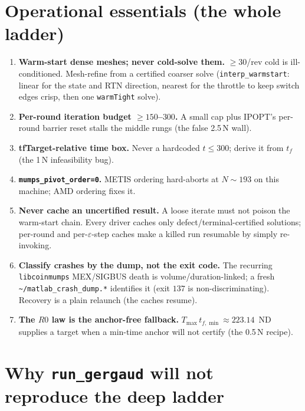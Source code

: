 \documentclass[11pt]{article}
\newcommand{\code}[1]{\texttt{\small #1}}
\newcommand{\file}[1]{\texttt{\small #1}}
\newcommand{\Tmax}{T_{\max}}
\begin{document}
\section{Operational essentials (the whole ladder)}
\label{sec:ops}
\begin{enumerate}[leftmargin=1.4em]
\item \textbf{Warm-start dense meshes; never cold-solve them.} $\ge30$/rev cold
is ill-conditioned. Mesh-refine from a certified coarser solve
(\file{interp\_warmstart}: linear for the state and RTN direction, nearest for
the throttle to keep switch edges crisp, then one \code{warmTight} solve).
\item \textbf{Per-round iteration budget $\ge150$--$300$.} A small cap plus
IPOPT's per-round barrier reset stalls the middle rungs (the false 2.5\,N wall).
\item \textbf{tfTarget-relative time box.} Never a hardcoded $t\le300$; derive it
from $t_f$ (the 1\,N infeasibility bug).
\item \textbf{\code{mumps\_pivot\_order=0}.} METIS ordering hard-aborts at
$N\!\sim\!193$ on this machine; AMD ordering fixes it.
\item \textbf{Never cache an uncertified result.} A loose iterate must not poison
the warm-start chain. Every driver caches only defect/terminal-certified
solutions; per-round and per-$\varepsilon$-step caches make a killed run
resumable by simply re-invoking.
\item \textbf{Classify crashes by the dump, not the exit code.} The recurring
\code{libcoinmumps} MEX/SIGBUS death is volume/duration-linked; a fresh
\file{\textasciitilde/matlab\_crash\_dump.*} identifies it (exit $137$ is
non-discriminating). Recovery is a plain relaunch (the caches resume).
\item \textbf{The $R0$ law is the anchor-free fallback.} $\Tmax\,t_{f,\min}
\approx223.14$~ND supplies a target when a min-time anchor will not certify
(the 0.5\,N recipe).
\end{enumerate}

\section{Why \file{run\_gergaud} will not reproduce the deep ladder}
\label{sec:whynot}
\end{document}
